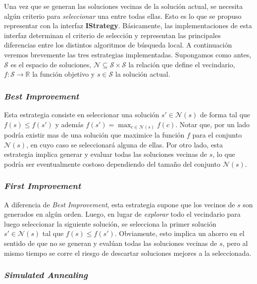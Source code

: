 Una vez que se generan las soluciones vecinas de la soluci\'on actual, se
necesita alg\'un criterio para \textit{seleccionar} una entre todas ellas. Esto
es lo que se propuso representar con la interfaz \textbf{IStrategy}.
B\'asicamente, las implementaciones de esta interfaz determinan el criterio de
selecci\'on y representan las principales diferencias entre los distintos
algoritmos de b\'usqueda local. A continuaci\'on veremos brevemente las tres
estrategias implementadas. Supongamos como antes, $\mathcal{S}$ es el espacio de
soluciones, $\mathcal{N} \subseteq \mathcal{S} \times \mathcal{S}$ la relaci\'on
que define el vecindario, $f: \mathcal{S} \rightarrow \mathbb{R}$ la funci\'on
objetivo y $s \in \mathcal{S}$ la soluci\'on actual.

\subsubsection{\textit{Best Improvement}}

Esta estrategia consiste en seleccionar una soluci\'on $s' \in \mathcal{N}(s)$
de forma tal que $f(s) \leq f(s')$ y adem\'as $f(s') = \max_{c \in
\mathcal{N}(s)} f(c)$. Notar que, por un lado podr\'ia existir mas de una
soluci\'on que maximice la funci\'on $f$ para el conjunto $\mathcal{N}(s)$, en
cuyo caso se seleccionar\'a alguna de ellas. Por otro lado, esta estrategia
implica generar y evaluar todas las soluciones vecinas de $s$, lo que
podr\'ia ser eventualmente costoso dependiendo del tama\~no del conjunto
$\mathcal{N}(s)$.

\subsubsection{\textit{First Improvement}}

A diferencia de \textit{Best Improvement}, esta estrategia supone que los
vecinos de $s$ son generados en alg\'un orden. Luego, en lugar de
\textit{explorar} todo el vecindario para luego seleccionar la
siguiente soluci\'on, se selecciona la primer soluci\'on $s' \in
\mathcal{N}(s)$ tal que $f(s) \leq f(s')$. Obviamente, esto implica un ahorro en
el sentido de que no se generan y eval\'uan todas las soluciones vecinas de $s$,
pero al mismo tiempo se corre el riesgo de descartar soluciones mejores a la
seleccionada.

\subsubsection{\textit{Simulated Annealing}}

